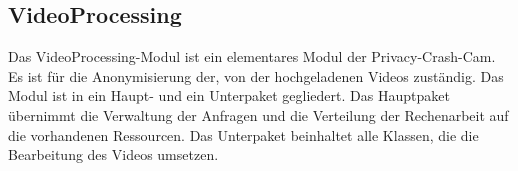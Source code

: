 \subsection{VideoProcessing} \label{service:modul:VideoProcessing}
Das VideoProcessing-Modul ist ein elementares Modul der Privacy-Crash-Cam. Es ist für die Anonymisierung der, von der  hochgeladenen Videos zuständig.\newline
Das Modul ist in ein Haupt- und ein Unterpaket gegliedert. Das Hauptpaket übernimmt die Verwaltung der Anfragen und die Verteilung der Rechenarbeit auf die vorhandenen Ressourcen. Das Unterpaket  beinhaltet alle Klassen, die die Bearbeitung des Videos umsetzen.